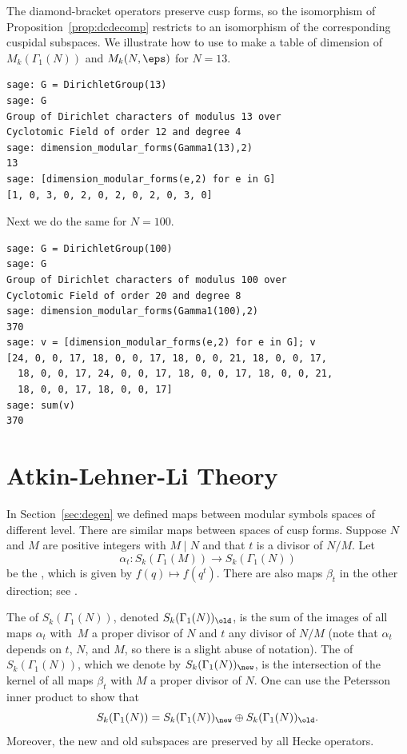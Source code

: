 The diamond-bracket operators preserve cusp forms, so
the isomorphism of Proposition~\ref{prop:dcdecomp} restricts to an
isomorphism of the corresponding cuspidal subspaces.  
We illustrate how to use \sage{}
to make a table of dimension of $M_k(\Gamma_1(N))$ 
and $M_k(N,\eps)$ for $N=13$.
\begin{verbatim}
sage: G = DirichletGroup(13)
sage: G
Group of Dirichlet characters of modulus 13 over 
Cyclotomic Field of order 12 and degree 4
sage: dimension_modular_forms(Gamma1(13),2)
13
sage: [dimension_modular_forms(e,2) for e in G]
[1, 0, 3, 0, 2, 0, 2, 0, 2, 0, 3, 0]
\end{verbatim}
Next we do the same for $N=100$.
\begin{verbatim}
sage: G = DirichletGroup(100)
sage: G
Group of Dirichlet characters of modulus 100 over 
Cyclotomic Field of order 20 and degree 8
sage: dimension_modular_forms(Gamma1(100),2)
370
sage: v = [dimension_modular_forms(e,2) for e in G]; v
[24, 0, 0, 17, 18, 0, 0, 17, 18, 0, 0, 21, 18, 0, 0, 17, 
  18, 0, 0, 17, 24, 0, 0, 17, 18, 0, 0, 17, 18, 0, 0, 21, 
  18, 0, 0, 17, 18, 0, 0, 17]
sage: sum(v)
370
\end{verbatim}


\section{Atkin-Lehner-Li Theory}\label{sec:ALL}
In Section~\ref{sec:degen} we defined maps between modular symbols
spaces of different level.  There are similar maps between spaces of
cusp forms.  Suppose $N$ and $M$ are positive integers with $M\mid N$
and that $t$ is a divisor of $N/M$.  Let
\begin{equation}\label{eqn:degenmf}
  \alpha_t : S_k(\Gamma_1(M)) \to S_k(\Gamma_1(N))
\end{equation}
be the , which is given by $f(q) \mapsto f(q^t)$.  
There are also maps $\beta_t$ in the other direction; see
\cite[Ch.~VIII]{lang:modular}.

The  of $S_k(\Gamma_1(N))$, denoted $S_k(\Gamma_1(N))_{\old}$,
is the sum of the images of all maps $\alpha_t$ with~$M$ a proper divisor
of $N$ and $t$ any divisor of $N/M$ (note that $\alpha_t$ depends on 
$t$, $N$, and $M$, so there is a slight abuse of notation).
The  of $S_k(\Gamma_1(N))$, which we denote by
$S_k(\Gamma_1(N))_{\new}$, is the intersection
of the kernel of all maps $\beta_t$ with $M$ a proper divisor
of $N$.  One can use the Petersson inner product to show
that 
$$
  S_k(\Gamma_1(N)) = S_k(\Gamma_1(N))_{\new} \oplus S_k(\Gamma_1(N))_{\old}.
$$
Moreover, the new and old subspaces are preserved by all
Hecke operators. 

